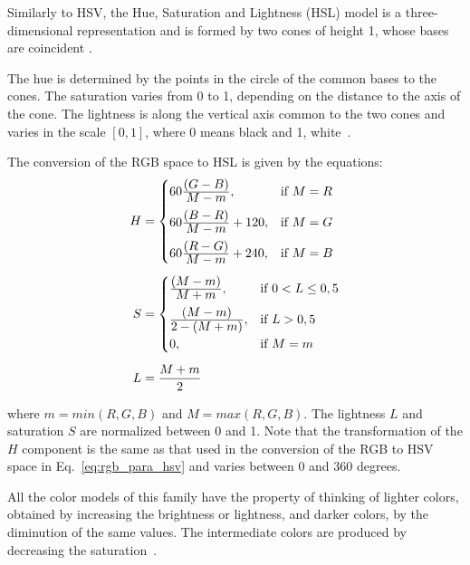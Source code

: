 Similarly to HSV, the Hue, Saturation and Lightness (HSL) model is a three-dimensional representation and is formed by two cones of height 1, whose bases are coincident \citep{pedrini:08}.

The hue is determined by the points in the circle of the common bases to the cones. The saturation varies from 0 to 1, depending on the distance to the axis of the cone. The lightness is along the vertical axis common to the two cones and varies in the scale $[0, 1]$, where 0 means black and 1, white~\citep{pedrini:08}.

The conversion of the RGB space to HSL is given by the equations:
\begin{align}
\label{eq:rgb_para_hsl}
\begin{split}
  H &=  \begin{cases}
            60\frac{\displaystyle (G - B)}{\displaystyle M - m}, & \text{if}\ M = R\\[0.7em]
            60\frac{\displaystyle (B - R)}{\displaystyle M - m} + 120, & \text{if}\ M = G\\[0.7em]
            60\frac{\displaystyle (R - G)}{\displaystyle M - m} + 240, & \text{if}\ M = B
       \end{cases}
  \\[0.5em]
  S &=  \begin{cases}
            \frac{\displaystyle (M - m)}{\displaystyle M + m}, & \text{if}\ 0 < L \leq 0,5\\[0.7em]
            \frac{\displaystyle (M - m)}{\displaystyle 2 - (M + m)}, & \text{if}\ L > 0,5\\[0.5em]
            0, & \text{if}\ M = m\\
       \end{cases}
  \\[0.5em]
  L &= \frac{M + m}{2}
\end{split}
\end{align}

\noindent where $m = min(R, G ,B)$ and $M = max(R, G ,B)$. The lightness $L$ and saturation $S$ are normalized between 0 and 1. Note that the transformation of the $H$ component is the same as that used in the conversion of the RGB to HSV space in Eq.~\ref{eq:rgb_para_hsv} and varies between 0 and 360 degrees.

All the color models of this family have the property of thinking of lighter colors, obtained by increasing the brightness or lightness, and darker colors, by the diminution of the same values. The intermediate colors are produced by decreasing the saturation~\citep{pedrini:08}.